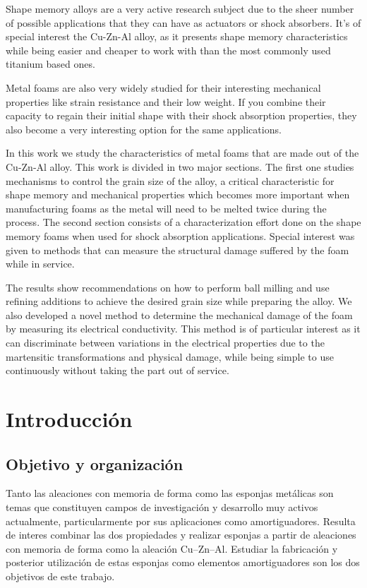 \documentclass[a4paper,12pt,fleqn,twoside,openany]{book}
\begin{document}
Shape memory alloys are a very active research subject due to the sheer number of possible applications that they can have as actuators or shock absorbers. It’s of special interest the Cu-Zn-Al alloy, as it presents shape memory characteristics while being easier and cheaper to work with than the most commonly used titanium based ones.
 
Metal foams are also very widely studied for their interesting mechanical properties like strain resistance and their low weight. If you combine their capacity to regain their initial shape with their shock absorption properties, they also become a very interesting option for the same applications.
 
In this work we study the characteristics of metal foams that are made out of the Cu-Zn-Al alloy. This work is divided in two major sections. The first one studies mechanisms to control the grain size of the alloy, a critical characteristic for shape memory and mechanical properties which becomes more important when manufacturing foams as the metal will need to be melted twice during the process. The second section consists of a characterization effort done on the shape memory foams when used for shock absorption applications. Special interest was given to methods that can measure the structural damage suffered by the foam while in service.
 
The results show recommendations on how to perform ball milling and use refining additions to achieve the desired grain size while preparing the alloy. We also developed a novel method to determine the mechanical damage of the foam by measuring its electrical conductivity. This method is of particular interest as it can discriminate between variations in the electrical properties due to the martensitic transformations and physical damage, while being simple to use continuously without taking the part out of service.

\chapter{Introducción}

\section*{Objetivo y organización}
Tanto las aleaciones con memoria de forma como las esponjas metálicas son temas que constituyen campos de investigación y desarrollo muy activos actualmente, particularmente por sus aplicaciones como amortiguadores. Resulta de interes combinar las dos propiedades y realizar esponjas a partir de aleaciones con memoria de forma como la aleación Cu–Zn–Al. Estudiar la fabricación y posterior utilización de estas esponjas como elementos amortiguadores son los dos objetivos de este trabajo.
\end{document}
